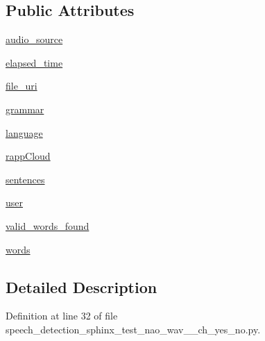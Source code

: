 \subsection*{Public Attributes}
\begin{DoxyCompactItemize}
\item 
\hyperlink{classspeech__detection__sphinx__test__nao__wav__1__ch__yes__no_1_1RappInterfaceTest_a35b1acb7313f6d358532fbdc8187378a}{audio\-\_\-source}
\item 
\hyperlink{classspeech__detection__sphinx__test__nao__wav__1__ch__yes__no_1_1RappInterfaceTest_ab892cf7d578a006caef0dc0ef41c6afe}{elapsed\-\_\-time}
\item 
\hyperlink{classspeech__detection__sphinx__test__nao__wav__1__ch__yes__no_1_1RappInterfaceTest_a2e3c2865e961e4a13d04be047237b344}{file\-\_\-uri}
\item 
\hyperlink{classspeech__detection__sphinx__test__nao__wav__1__ch__yes__no_1_1RappInterfaceTest_a6a33e65a03c86d6d876c3be0c9f16e07}{grammar}
\item 
\hyperlink{classspeech__detection__sphinx__test__nao__wav__1__ch__yes__no_1_1RappInterfaceTest_a0b79781b4d3f5fe966a8adc65e29500f}{language}
\item 
\hyperlink{classspeech__detection__sphinx__test__nao__wav__1__ch__yes__no_1_1RappInterfaceTest_a0c00aeb0e2f760d02b348f89c8f21537}{rapp\-Cloud}
\item 
\hyperlink{classspeech__detection__sphinx__test__nao__wav__1__ch__yes__no_1_1RappInterfaceTest_a8f4e1442c9d5f4cab356c9dd7fd2065a}{sentences}
\item 
\hyperlink{classspeech__detection__sphinx__test__nao__wav__1__ch__yes__no_1_1RappInterfaceTest_a2a60e2217247ac5c07556d657640db9e}{user}
\item 
\hyperlink{classspeech__detection__sphinx__test__nao__wav__1__ch__yes__no_1_1RappInterfaceTest_a99d9b39240d5ad670649d8e537de11f7}{valid\-\_\-words\-\_\-found}
\item 
\hyperlink{classspeech__detection__sphinx__test__nao__wav__1__ch__yes__no_1_1RappInterfaceTest_a731be0ea0672a8fbcd60e2d929f75a92}{words}
\end{DoxyCompactItemize}


\subsection{Detailed Description}


Definition at line 32 of file speech\-\_\-detection\-\_\-sphinx\-\_\-test\-\_\-nao\-\_\-wav\-\_\-\_\-ch\-\_\-yes\-\_\-no.\-py.




